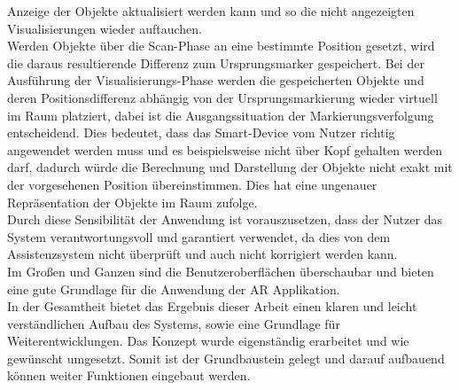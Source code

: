 Anzeige der Objekte aktualisiert werden kann und so die nicht angezeigten Visualisierungen wieder auftauchen.
\\ 
\linebreak
Werden Objekte über die Scan-Phase an eine bestimmte Position gesetzt, wird die daraus resultierende Differenz zum Ursprungsmarker gespeichert. Bei der 
Ausführung der Visualisierungs-Phase werden die gespeicherten Objekte und deren Positionsdifferenz abhängig von der Ursprungsmarkierung wieder virtuell im Raum platziert, 
dabei ist die Ausgangssituation der Markierungsverfolgung entscheidend. Dies bedeutet, dass das Smart-Device vom Nutzer richtig angewendet werden muss und es beispielsweise 
nicht über Kopf gehalten werden darf, dadurch würde die Berechnung und Darstellung der Objekte nicht exakt mit der vorgesehenen Position übereinstimmen. Dies hat eine 
ungenauer Repräsentation der Objekte im Raum zufolge. 
\\ 
Durch diese Sensibilität der Anwendung ist vorauszusetzen, dass der Nutzer das System verantwortungsvoll und garantiert verwendet, da dies von dem Assistenzsystem nicht überprüft 
und auch nicht korrigiert werden kann. 
\\ 
\linebreak
Im Großen und Ganzen sind die Benutzeroberflächen überschaubar und bieten eine gute Grundlage für die Anwendung der \acl{AR} Applikation. 
\\ 
\linebreak
In der Gesamtheit bietet das Ergebnis dieser Arbeit einen klaren und leicht verständlichen Aufbau des Systems, sowie eine Grundlage für Weiterentwicklungen. 
Das Konzept wurde eigenständig erarbeitet und wie gewünscht umgesetzt. Somit ist der Grundbaustein gelegt und darauf aufbauend können weiter Funktionen eingebaut werden. 



